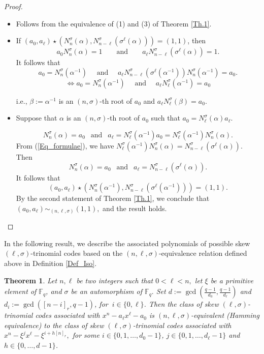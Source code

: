 \documentclass[12pt,paper]{article}
\theoremstyle{plain}
\newtheorem{theorem}{Theorem}[section] %
\newcommand{\Fq}{\mathbb{F}_{q}}
\begin{document}
\begin{proof}\;
\begin{itemize}
    \item[(1) $\Rightarrow$ (2):] Follows from the equivalence of  (1) and (3) of Theorem \ref{Th.1}.
 \item[(2) $\Rightarrow$ (3):]  
 If $(a_0, a_{\ell})\star\left(N_n^{\sigma}(\alpha), N_{n-\ell}^{\sigma}(\sigma^{\ell}(\alpha))\right) = (1, 1)$, then 
$$ a_0 N_n^{\sigma}(\alpha)=1 \quad \quad 
\text{and} \quad  
 \quad a_\ell N_{n-\ell}^{\sigma}(\sigma^{\ell}(\alpha))=1.
$$
 It follows that
 $$  a_0 = N_n^{\sigma}(\alpha^{-1}) \quad \text{ and } \quad  a_\ell N_{n-\ell}^{\sigma}(\sigma^{\ell}(\alpha^{-1}) ) N_n^{\sigma}(\alpha^{-1}) = a_0.
  $$
 $$ \iff a_0 = N_n^{\sigma}(\alpha^{-1}) \quad \text{ and } \quad  a_{\ell} N_{\ell}^\sigma(\alpha^{-1})= a_0 $$
 
  i.e., $\beta:=\alpha^{-1}$ is an $(n,\sigma)$-th root of $a_0$ and $  a_{\ell} N_{\ell}^\sigma(\beta)= a_0  $.
 

 \item[(3) $\Rightarrow$ (1):] Suppose that $\alpha $ is an $(n,\sigma)$-th root of $a_0$ such that $ a_0 =  N^{\sigma}_{\ell}(\alpha) a_\ell.$

 $$ N_{n}^{\sigma}(\alpha)  = a_0\ \ \text{ and } \ \   
   a_{\ell}=  N^{\sigma}_{\ell}(\alpha^{-1})a_0= N^{\sigma}_{\ell}(\alpha^{-1}) N_{n}^{\sigma}(\alpha). $$ 
From (\ref{Eq_formulae}), we have $ N^{\sigma}_{\ell}(\alpha^{-1}) N_{n}^{\sigma}(\alpha)=  N_{n-\ell}^{\sigma}(\sigma^{\ell}(\alpha)).$
Then 
$$ N_{n}^{\sigma}(\alpha)  = a_0\ \ \text{ and } \ \   
   a_{\ell}= N_{n-\ell}^{\sigma}(\sigma^{\ell}(\alpha)). $$ 
 It follows that  
$$(a_0,a_{\ell} )\star \left(N_{n}^{\sigma}(\alpha^{-1}), N_{n-\ell}^{\sigma}(\sigma^{\ell}(\alpha^{-1})) \right)= (1,1) .$$
 By the second statement of Theorem \ref{Th.1}, we conclude that  $ (a_0, a_{\ell}) \sim_{(n,\ell,\sigma)}(1,1) ,$ and the result holds.  

   
\end{itemize}
 
 \end{proof}

 




  In the following result, we describe the associated polynomials of possible skew $(\ell,\sigma)$-trinomial codes based on the $(n,\ell,\sigma)$-equivalence relation defined above in Definition \ref{Def_Iso}.
\begin{theorem} \label{Equiv_2}
Let $n, \ell$ be two integers such that $0<\ell<n,$ let $\xi$ be  a primitive element of $\Fq$, and $\sigma$ be an automorphism of $ \Fq.$  Set  $ 
 d:=\gcd \left(\frac{q-1}{ d_0}, \frac{q-1}{ d_{\ell}}\right)$  and $ d_i:=\gcd([n-i]_r,q-1)$, for $ \ i\in \{0,\ell\}$.  Then the class of skew  $(\ell,\sigma)$-trinomial  codes associated with $x^n-a_{\ell}x^{\ell}-a_0$ is $(n,\ell,\sigma)$-equivalent (Hamming equivalence) to the class of skew  $(\ell,\sigma)$-trinomial  codes associated with  $x^n-\xi^{j} x^{\ell}- \xi^{i+h[n]_r},$ for some $i\in\{0,1,\ldots, d_0-1\}$,  $j\in \{0,1,\ldots, d_{\ell}-1\}$  and $ h\in \{0,\ldots, d-1\}$.  
\end{theorem}
\end{document}
